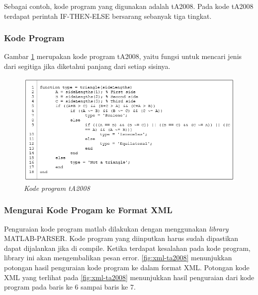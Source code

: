 Sebagai contoh, kode program yang digunakan adalah tA2008. Pada kode tA2008 terdapat perintah IF-THEN-ELSE bersarang sebanyak tiga tingkat. 

\subsubsection*{Kode Program}
Gambar \ref{fig:tA2008} merupakan kode program tA2008, yaitu fungsi untuk mencari jenis dari segitiga jika diketahui panjang dari setiap sisinya.
\begin{figure}
	\centering
	\includegraphics[width=0.95\linewidth]{gambar/tA2008}
	\caption{\textit{Kode program tA2008}}
	\label{fig:tA2008}
\end{figure}

\subsubsection*{Mengurai Kode Progam ke Format XML}
Penguraian kode program matlab dilakukan dengan menggunakan \textit{library}  MATLAB-PARSER. Kode program yang diinputkan harus sudah dipastikan dapat dijalankan jika di compile. Ketika terdapat kesalahan pada kode program, library  ini akan mengembalikan pesan error. \ref{fig:xml-ta2008} menunjukkan potongan hasil penguraian kode program ke dalam format XML. Potongan kode XML yang terlihat pada \ref{fig:xml-ta2008} menunjukkan hasil penguraian dari kode program pada baris ke 6 sampai baris ke 7.

